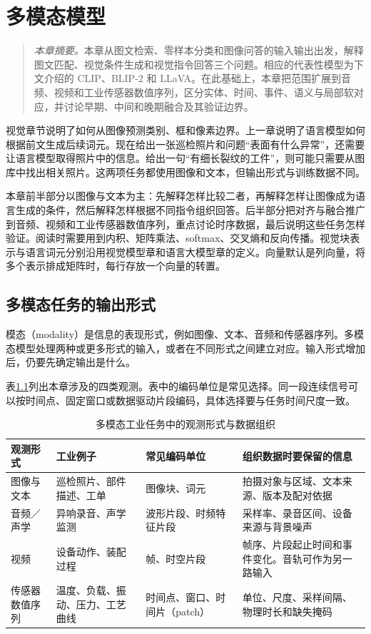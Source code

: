 \chapter{多模态模型}
\begin{quote}\small
\textit{本章摘要。}本章从图文检索、零样本分类和图像问答的输入输出出发，解释图文匹配、视觉条件生成和视觉指令回答三个问题。相应的代表性模型为下文介绍的 CLIP、BLIP-2 和 LLaVA。在此基础上，本章把范围扩展到音频、视频和工业传感器数值序列，区分实体、时间、事件、语义与局部软对应，并讨论早期、中间和晚期融合及其验证边界。
\end{quote}
视觉章节说明了如何从图像预测类别、框和像素边界。上一章说明了语言模型如何根据前文生成后续词元。现在给出一张巡检照片和问题“表面有什么异常”，还需要让语言模型取得照片中的信息。给出一句“有细长裂纹的工件”，则可能只需要从图库中找出相关照片。这两项任务都使用图像和文本，但输出形式与训练数据不同。

本章前半部分以图像与文本为主：先解释怎样比较二者，再解释怎样让图像成为语言生成的条件，然后解释怎样根据不同指令组织回答。后半部分把对齐与融合推广到音频、视频和工业传感器数值序列，重点讨论时序数据，最后说明这些任务怎样验证。阅读时需要用到内积、矩阵乘法、softmax、交叉熵和反向传播。视觉块表示与语言词元分别沿用视觉模型章和语言大模型章的定义。向量默认是列向量，将多个表示排成矩阵时，每行存放一个向量的转置。

\section{多模态任务的输出形式}
模态（modality）是信息的表现形式，例如图像、文本、音频和传感器序列。多模态模型处理两种或更多形式的输入，或者在不同形式之间建立对应。输入形式增加后，仍要先确定输出是什么。

表\ref{tab:multimodal-observation-range}列出本章涉及的四类观测。表中的编码单位是常见选择。同一段连续信号可以按时间点、固定窗口或数据驱动片段编码，具体选择要与任务时间尺度一致。

\begin{table}[htbp]
\centering
\caption{多模态工业任务中的观测形式与数据组织}
\label{tab:multimodal-observation-range}
\small
\setlength{\tabcolsep}{3pt}
\begin{tabular}{@{}>{\raggedright\arraybackslash}m{1.8cm}>{\raggedright\arraybackslash}m{3.0cm}>{\raggedright\arraybackslash}m{3.0cm}>{\raggedright\arraybackslash}m{4.3cm}@{}}
\toprule
观测形式 & 工业例子 & 常见编码单位 & 组织数据时要保留的信息 \\
\midrule
图像与文本 & 巡检照片、部件描述、工单 & 图像块、词元 & 拍摄对象与区域、文本来源、版本及配对依据 \\
音频／声学 & 异响录音、声学监测 & 波形片段、时频特征片段 & 采样率、录音区间、设备来源与背景噪声 \\
视频 & 设备动作、装配过程 & 帧、时空片段 & 帧序、片段起止时间和事件变化。音轨可作为另一路输入 \\
传感器数值序列 & 温度、负载、振动、压力、工艺曲线 & 时间点、窗口、时间片（patch） & 单位、尺度、采样间隔、物理时长和缺失掩码 \\
\bottomrule
\end{tabular}
\end{table}


